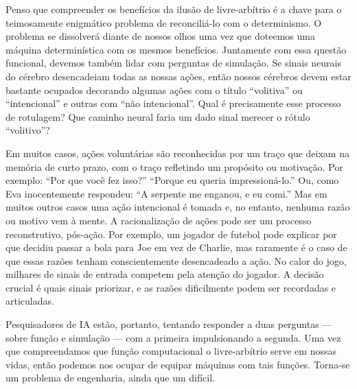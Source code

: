 \documentclass[11pt,a5paper,twoside]{book}
\begin{document}
Penso que compreender os benefícios da ilusão de livre-arbítrio é a chave para o teimosamente enigmático problema de reconciliá-lo com o determinismo. O problema se dissolverá diante de nossos olhos uma vez que doteemos uma máquina determinística com os mesmos benefícios. Juntamente com essa questão funcional, devemos também lidar com perguntas de simulação. Se sinais neurais do cérebro desencadeiam todas as nossas ações, então nossos cérebros devem estar bastante ocupados decorando algumas ações com o título “volitiva” ou “intencional” e outras com “não intencional”. Qual é precisamente esse processo de rotulagem? Que caminho neural faria um dado sinal merecer o rótulo “volitivo”?

Em muitos casos, ações voluntárias são reconhecidas por um traço que deixam na memória de curto prazo, com o traço refletindo um propósito ou motivação. Por exemplo: “Por que você fez isso?” “Porque eu queria impressioná-lo.” Ou, como Eva inocentemente respondeu: “A serpente me enganou, e eu comi.” Mas em muitos outros casos uma ação intencional é tomada e, no entanto, nenhuma razão ou motivo vem à mente. A racionalização de ações pode ser um processo reconstrutivo, pós-ação. Por exemplo, um jogador de futebol pode explicar por que decidiu passar a bola para Joe em vez de Charlie, mas raramente é o caso de que essas razões tenham conscientemente desencadeado a ação. No calor do jogo, milhares de sinais de entrada competem pela atenção do jogador. A decisão crucial é quais sinais priorizar, e as razões dificilmente podem ser recordadas e articuladas.

Pesquisadores de IA estão, portanto, tentando responder a duas perguntas — sobre função e simulação — com a primeira impulsionando a segunda. Uma vez que compreendamos que função computacional o livre-arbítrio serve em nossas vidas, então podemos nos ocupar de equipar máquinas com tais funções. Torna-se um problema de engenharia, ainda que um difícil.
\end{document}
